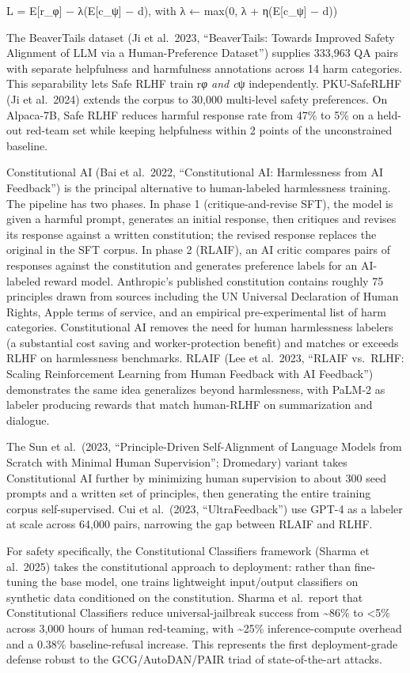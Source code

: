L = E{[}r\_φ{]} − λ(E{[}c\_ψ{]} − d), with λ ← max(0, λ + η(E{[}c\_ψ{]} − d))

The BeaverTails dataset (Ji et al.~2023, ``BeaverTails: Towards Improved Safety Alignment of LLM via a Human-Preference Dataset'') supplies 333,963 QA pairs with separate helpfulness and harmfulness annotations across 14 harm categories. This separability lets Safe RLHF train r\emph{φ and c}ψ independently. PKU-SafeRLHF (Ji et al.~2024) extends the corpus to 30,000 multi-level safety preferences. On Alpaca-7B, Safe RLHF reduces harmful response rate from 47\% to 5\% on a held-out red-team set while keeping helpfulness within 2 points of the unconstrained baseline.

Constitutional AI (Bai et al.~2022, ``Constitutional AI: Harmlessness from AI Feedback'') is the principal alternative to human-labeled harmlessness training. The pipeline has two phases. In phase 1 (critique-and-revise SFT), the model is given a harmful prompt, generates an initial response, then critiques and revises its response against a written constitution; the revised response replaces the original in the SFT corpus. In phase 2 (RLAIF), an AI critic compares pairs of responses against the constitution and generates preference labels for an AI-labeled reward model. Anthropic's published constitution contains roughly 75 principles drawn from sources including the UN Universal Declaration of Human Rights, Apple terms of service, and an empirical pre-experimental list of harm categories. Constitutional AI removes the need for human harmlessness labelers (a substantial cost saving and worker-protection benefit) and matches or exceeds RLHF on harmlessness benchmarks. RLAIF (Lee et al.~2023, ``RLAIF vs.~RLHF: Scaling Reinforcement Learning from Human Feedback with AI Feedback'') demonstrates the same idea generalizes beyond harmlessness, with PaLM-2 as labeler producing rewards that match human-RLHF on summarization and dialogue.

The Sun et al.~(2023, ``Principle-Driven Self-Alignment of Language Models from Scratch with Minimal Human Supervision''; Dromedary) variant takes Constitutional AI further by minimizing human supervision to about 300 seed prompts and a written set of principles, then generating the entire training corpus self-supervised. Cui et al.~(2023, ``UltraFeedback'') use GPT-4 as a labeler at scale across 64,000 pairs, narrowing the gap between RLAIF and RLHF.

For safety specifically, the Constitutional Classifiers framework (Sharma et al.~2025) takes the constitutional approach to deployment: rather than fine-tuning the base model, one trains lightweight input/output classifiers on synthetic data conditioned on the constitution. Sharma et al.~report that Constitutional Classifiers reduce universal-jailbreak success from \textasciitilde86\% to \textless5\% across 3,000 hours of human red-teaming, with \textasciitilde25\% inference-compute overhead and a 0.38\% baseline-refusal increase. This represents the first deployment-grade defense robust to the GCG/AutoDAN/PAIR triad of state-of-the-art attacks.


